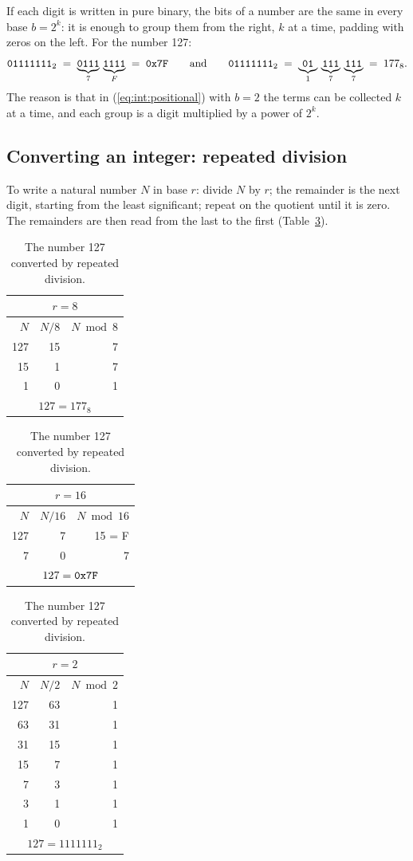 If each digit is written in pure binary, the bits of a number are the same in
every base $b=2^{k}$: it is enough to group them from the right, $k$ at a
time, padding with zeros on the left. For the number 127:
\[
\texttt{01111111}_2 \;=\; \underbrace{\texttt{0111}}_{7}\,\underbrace{\texttt{1111}}_{F}
 \;=\; \texttt{0x7F}
\qquad\text{and}\qquad
\texttt{01111111}_2 \;=\; \underbrace{\texttt{01}}_{1}\,\underbrace{\texttt{111}}_{7}\,\underbrace{\texttt{111}}_{7}
 \;=\; 177_8 .
\]
The reason is that in (\ref{eq:int:positional}) with $b=2$ the terms can be
collected $k$ at a time, and each group is a digit multiplied by a power of
$2^{k}$.

\subsection{Converting an integer: repeated division}

To write a natural number $N$ in base $r$: divide $N$ by $r$; the remainder is
the next digit, starting from the least significant; repeat on the quotient
until it is zero. The remainders are then read from the last to the first
(Table~\ref{tab:int:division}).

\begin{table}[htb]
\centering\small
\caption{The number 127 converted by repeated division.}\label{tab:int:division}
\begin{tabular}{@{}rrr@{}}
\multicolumn{3}{c}{$r=8$}\\\toprule
$N$ & $N/8$ & $N \bmod 8$\\\midrule
127 & 15 & 7\\ 15 & 1 & 7\\ 1 & 0 & 1\\\bottomrule
\multicolumn{3}{c}{$127 = 177_8$}
\end{tabular}\qquad
\begin{tabular}{@{}rrr@{}}
\multicolumn{3}{c}{$r=16$}\\\toprule
$N$ & $N/16$ & $N \bmod 16$\\\midrule
127 & 7 & 15 = F\\ 7 & 0 & 7\\\bottomrule
\multicolumn{3}{c}{$127 = \texttt{0x7F}$}
\end{tabular}\qquad
\begin{tabular}{@{}rrr@{}}
\multicolumn{3}{c}{$r=2$}\\\toprule
$N$ & $N/2$ & $N \bmod 2$\\\midrule
127 & 63 & 1\\ 63 & 31 & 1\\ 31 & 15 & 1\\ 15 & 7 & 1\\ 7 & 3 & 1\\ 3 & 1 & 1\\ 1 & 0 & 1\\\bottomrule
\multicolumn{3}{c}{$127 = 1111111_2$}
\end{tabular}
\end{table}

